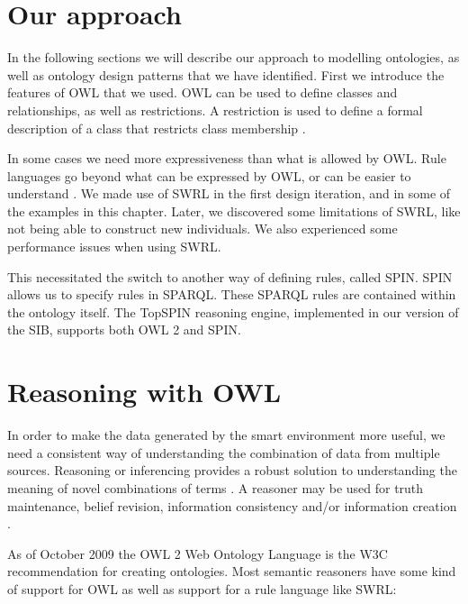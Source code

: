 \section{Our approach}

In the following sections we will describe our approach to modelling ontologies, as well as ontology design patterns that we have identified. First we introduce the features of \ac{OWL} that we used. \ac{OWL} can be used to define classes and relationships, as well as restrictions. A restriction is used to define a formal description of a class that restricts class membership \cite{Allemang2011}. 

In some cases we need more expressiveness than what is allowed by \ac{OWL}. Rule languages go beyond what can be expressed by \ac{OWL}, or can be easier to understand \cite{Hebeler2009}. We made use of \ac{SWRL} in the first design iteration, and in some of the examples in this chapter. Later, we discovered some limitations of \ac{SWRL}, like not being able to construct new individuals. We also experienced some performance issues when using \ac{SWRL}.

This necessitated the switch to another way of defining rules, called \ac{SPIN}. \ac{SPIN} allows us to specify rules in \ac{SPARQL}. These \ac{SPARQL} rules are contained within the ontology itself. The TopSPIN reasoning engine, implemented in our version of the \ac{SIB}, supports both \ac{OWL} 2 and \ac{SPIN}.



\section{Reasoning with OWL}
\label{owlreasoning}
In order to make the data generated by the smart environment more useful, we need a consistent way of understanding the combination of data from multiple sources. Reasoning or inferencing provides a robust solution to understanding the meaning of novel combinations of terms \cite{Hebeler2009}. A reasoner may be used for truth maintenance, belief revision, information consistency and/or information creation \cite{Oliver2008}.

As of October 2009 the \ac{OWL} 2 Web Ontology Language is the W3C recommendation for creating ontologies. Most semantic reasoners have some kind of support for \ac{OWL} as well as support for a rule language like \ac{SWRL}:

